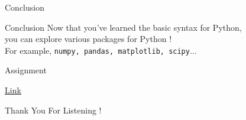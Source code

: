 \documentclass{beamer}
\begin{document}
    \begin{frame}[plain, c]
        \begin{center}
            \color{blue} \LARGE Conclusion
        \end{center}
    \end{frame}
    
    \begin{frame}{Conclusion}
        Now that you've learned the basic syntax for Python, \\
        you can explore various packages for Python ! \\
        For example, \texttt{numpy, pandas, matplotlib, scipy}... \\
        
    \end{frame}

    \begin{frame}[plain, c]
        \begin{center}
            \color{blue} \LARGE Assignment
        \end{center}
        \color{black} \normalsize \vskip 10pt
        \begin{center}
            \href{https://pdogs.ntu.im/my-class/11/35/challenge/369}{Link}
        \end{center}
    \end{frame}





    
    \begin{frame}[plain, c]
        \begin{center}
            \color{blue} \LARGE Thank You For Listening !
        \end{center}
    \end{frame}
\end{document}
